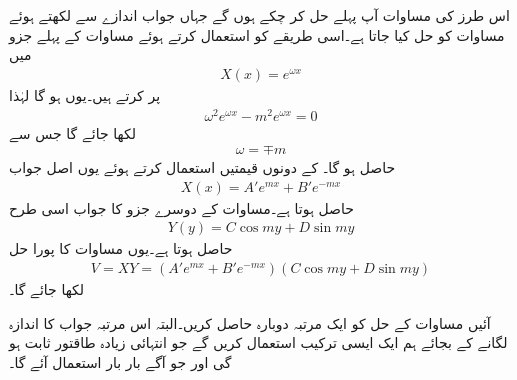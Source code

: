 اس طرز کی مساوات آپ پہلے حل کر چکے ہوں گے جہاں جواب اندازے سے لکھتے ہوئے مساوات کو حل کیا جاتا ہے۔اسی طریقے کو استعمال کرتے ہوئے مساوات  کے پہلے جزو میں
\begin{align*}
X(x)=e^{\omega x}
\end{align*}
پر کرتے ہیں۔یوں  ہو گا لہٰذا
\begin{align*}
\omega^2 e^{\omega x}-m^2 e^{\omega x}=0
\end{align*}
لکھا جائے گا جس سے 
\begin{align*}
\omega = \mp m
\end{align*}
حاصل ہو گا۔ کے دونوں قیمتیں استعمال کرتے ہوئے یوں اصل جواب
\begin{align}\label{مساوات_لاپلاس_اندازہ_الف}
X(x)=A' e^{mx}+B' e^{-m x}
\end{align} 
حاصل ہوتا ہے۔مساوات  کے دوسرے جزو کا جواب اسی طرح
\begin{align}\label{مساوات_لاپلاس_اندازہ_ب}
Y(y)=C \cos m y+D \sin m y
\end{align}
حاصل ہوتا ہے۔یوں مساوات  کا پورا حل
\begin{align}\label{مساوات_لاپلاس_اندازہ_پ}
V=XY=\left(A' e^{mx}+B' e^{-m x} \right) \left(C \cos m y+D \sin m y \right)
\end{align}
لکھا جائے گا۔

آئیں مساوات  کے حل کو ایک مرتبہ دوبارہ حاصل کریں۔البتہ اس مرتبہ جواب کا اندازہ لگانے کے بجائے ہم ایک ایسی ترکیب استعمال کریں گے جو انتہائی زیادہ طاقتور ثابت ہو گی اور جو آگے بار بار استعمال آئے گا۔

